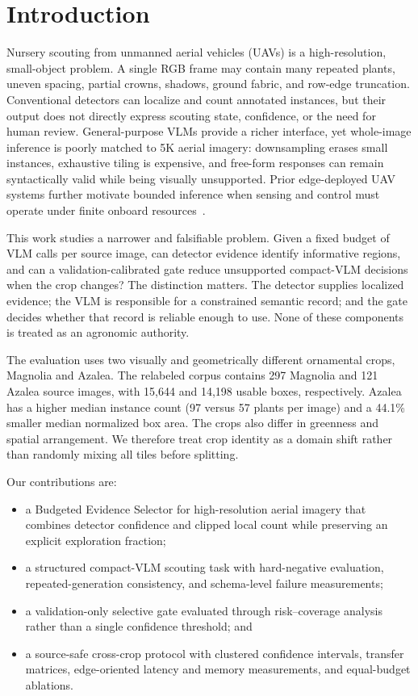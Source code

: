\section{Introduction}
Nursery scouting from unmanned aerial vehicles (UAVs) is a high-resolution, small-object problem. A single RGB frame may contain many repeated plants, uneven spacing, partial crowns, shadows, ground fabric, and row-edge truncation. Conventional detectors can localize and count annotated instances, but their output does not directly express scouting state, confidence, or the need for human review. General-purpose VLMs provide a richer interface, yet whole-image inference is poorly matched to 5K aerial imagery: downsampling erases small instances, exhaustive tiling is expensive, and free-form responses can remain syntactically valid while being visually unsupported. Prior edge-deployed UAV systems further motivate bounded inference when sensing and control must operate under finite onboard resources~\cite{kode2026drone}.

This work studies a narrower and falsifiable problem. Given a fixed budget of VLM calls per source image, can detector evidence identify informative regions, and can a validation-calibrated gate reduce unsupported compact-VLM decisions when the crop changes? The distinction matters. The detector supplies localized evidence; the VLM is responsible for a constrained semantic record; and the gate decides whether that record is reliable enough to use. None of these components is treated as an agronomic authority.

The evaluation uses two visually and geometrically different ornamental crops, Magnolia and Azalea. The relabeled corpus contains 297 Magnolia and 121 Azalea source images, with 15,644 and 14,198 usable boxes, respectively. Azalea has a higher median instance count (97 versus 57 plants per image) and a 44.1\% smaller median normalized box area. The crops also differ in greenness and spatial arrangement. We therefore treat crop identity as a domain shift rather than randomly mixing all tiles before splitting.

Our contributions are:
\begin{itemize}[leftmargin=*,nosep]
    \item a Budgeted Evidence Selector for high-resolution aerial imagery that combines detector confidence and clipped local count while preserving an explicit exploration fraction;
    \item a structured compact-VLM scouting task with hard-negative evaluation, repeated-generation consistency, and schema-level failure measurements;
    \item a validation-only selective gate evaluated through risk--coverage analysis rather than a single confidence threshold; and
    \item a source-safe cross-crop protocol with clustered confidence intervals, transfer matrices, edge-oriented latency and memory measurements, and equal-budget ablations.
\end{itemize}

